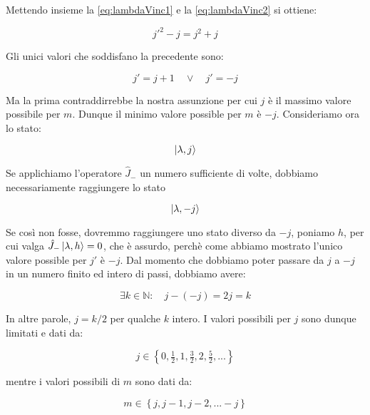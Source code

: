 Mettendo insieme la \eqref{eq:lambdaVinc1} e la \eqref{eq:lambdaVinc2} si ottiene:

	\begin{equation}
		j'^2 - j = j^2 + j
	\end {equation}

Gli unici valori che soddisfano la precedente sono:

	\[
		j' = j + 1 \quad \vee \quad j' = -j
	\]

Ma la prima contraddirrebbe la nostra assunzione per cui $j$ \`e il massimo valore possibile per $m$. Dunque il minimo valore possible per $m$ \`e $-j$. Consideriamo ora lo stato:

	\[
		\ket{\lambda, j}
	\]

Se applichiamo l'operatore $\hat{J}_-$ un numero sufficiente di volte, dobbiamo necessariamente raggiungere lo stato

	\[
		\ket{\lambda, -j}
	\]

Se cos\`i non fosse, dovremmo raggiungere uno stato diverso da $-j$, poniamo $h$, per cui valga $\hat{J}_- \ket{\lambda, h} = 0$, che \`e assurdo, perch\`e come abbiamo mostrato l'unico valore possible per $j'$ \`e $-j$. Dal momento che dobbiamo poter passare da $j$ a $-j$ in un numero finito ed intero di passi, dobbiamo avere:

	\begin{equation}
		\exists k \in \mathbb{N} : \quad j - (- j) = 2j = k
	\end{equation}

In altre parole, $j = k/2$ per qualche $k$ intero. I valori possibili per $j$ sono dunque limitati e dati da:

	\begin{equation}
		j \in \left \{ 0, \tfrac{1}{2}, 1, \tfrac{3}{2}, 2, \tfrac{5}{2}, ... \right \}
	\end{equation}

mentre i valori possibili di $m$ sono dati da:

	\begin{equation}
		m \in \left \{ j, j-1, j-2, ... -j \right \}
	\end{equation}
